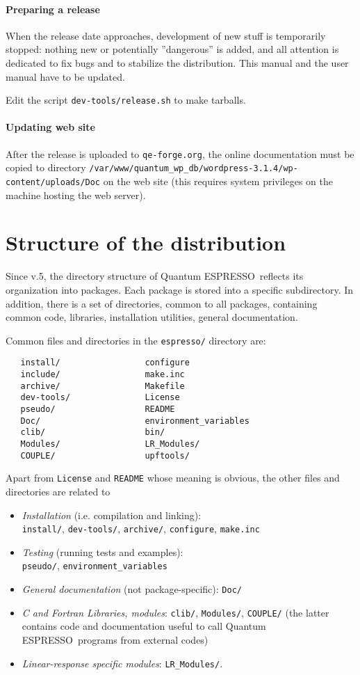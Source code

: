 \documentclass[12pt,a4paper]{article}
\def\qe{{\sc Quantum ESPRESSO}}
\def\qeforge{\texttt{qe-forge.org}}
\def\configure{\texttt{configure}}
\def\make.inc{\texttt{make.inc}}
\begin{document}
\paragraph{Preparing a release}
When the release date approaches, development of new stuff is temporarily
stopped: nothing new or potentially ''dangerous'' is added, and all
attention is dedicated to fix bugs and to stabilize the distribution.
This manual and the user manual have to be updated.

Edit the script \texttt{dev-tools/release.sh} to make tarballs.

\paragraph{Updating web site} After the release is uploaded to
\qeforge, the online documentation must be copied to directory
\texttt{/var/www/quantum\_wp\_db/wordpress-3.1.4/wp-content/uploads/Doc}
on the web site (this requires system privileges on the machine hosting
the web server).

\section{Structure of the distribution}

Since v.5, the directory structure of \qe\ reflects its organization
into packages. Each package is stored into a specific subdirectory.
In addition, there is a set of directories, common to all packages,
containing common code,
libraries, installation utilities, general documentation.

Common files and directories in the \texttt{espresso/} directory are:
\begin{verbatim}
   install/                 configure
   include/                 make.inc
   archive/                 Makefile
   dev-tools/               License
   pseudo/                  README
   Doc/                     environment_variables
   clib/                    bin/
   Modules/                 LR_Modules/
   COUPLE/                  upftools/
\end{verbatim}
Apart from  \texttt{License} and \texttt{README} whose meaning is
obvious, the other files and directories are related to
\begin{itemize}
\item {\em Installation} (i.e. compilation and linking):\\
\texttt{install/}, \texttt{dev-tools/}, \texttt{archive/},
\configure, \make.inc
\item  {\em Testing} (running tests and examples):\\
\texttt{pseudo/}, \texttt{environment\_variables}
\item  {\em General documentation} (not package-specific):
\texttt{Doc/}
\item {\em  C and Fortran Libraries, modules}:
\texttt{clib/}, \texttt{Modules/}, \texttt{COUPLE/}
(the latter contains code and documentation useful to call \qe\ programs
 from external codes)
\item {\em  Linear-response specific modules}:
\texttt{LR\_Modules/}.
\end{itemize}
\end{document}
